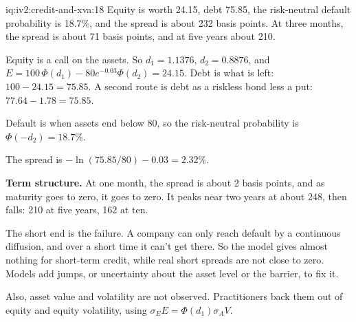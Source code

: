 \begin{solution}{iq:iv2:credit-and-xva:18}
Equity is worth 24.15, debt 75.85, the risk-neutral default probability is 18.7\%, and the spread is about 232 basis points. At three months, the spread is about 71 basis points, and at five years about 210.

Equity is a call on the assets. So $d_1 = 1.1376$, $d_2 = 0.8876$, and $E = 100\,\Phi(d_1) - 80 e^{-0.03}\Phi(d_2) = 24.15$. Debt is what is left: $100 - 24.15 = 75.85$. A second route is debt as a riskless bond less a put: $77.64 - 1.78 = 75.85$.

Default is when assets end below 80, so the risk-neutral probability is $\Phi(-d_2) = 18.7\%$.

The spread is $-\ln(75.85/80) - 0.03 = 2.32\%$.

\textbf{Term structure.} At one month, the spread is about 2 basis points, and as maturity goes to zero, it goes to zero. It peaks near two years at about 248, then falls: 210 at five years, 162 at ten.

The short end is the failure. A company can only reach default by a continuous diffusion, and over a short time it can't get there. So the model gives almost nothing for short-term credit, while real short spreads are not close to zero. Models add jumps, or uncertainty about the asset level or the barrier, to fix it.

Also, asset value and volatility are not observed. Practitioners back them out of equity and equity volatility, using $\sigma_E E = \Phi(d_1)\sigma_A V$.

\end{solution}

